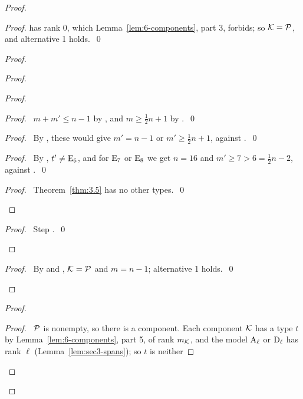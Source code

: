 \begin{proof}
\begin{proof}
  has rank 0, which Lemma~\ref{lem:6-components}, part 3, forbids; so ${\mathcal K}={\mathcal P}$, and
  alternative 1 holds.~\qed\end{proof}
 \begin{proof}
  \begin{proof}
   \begin{proof}
    \begin{proof}\pf\ $m+m'\leq n-1$ by , and $m\geq\frac12n+1$ by
     .~\qed\end{proof}
    \begin{proof}\pf\ By , these would give $m'=n-1$ or
     $m'\geq\frac12n+1$, against .~\qed\end{proof}
    \begin{proof}\pf\ By , $t'\neq\mathrm{E}_6$, and for $\mathrm{E}_7$ or $\mathrm{E}_8$
     we get $n=16$ and $m'\geq7>6=\frac12n-2$, against .~\qed\end{proof}
    \qedstep
    \begin{proof}\pf\ Theorem~\ref{thm:3.5} has no other types.~\qed\end{proof}
   \end{proof}
   \qedstep
   \begin{proof}\pf\ Step .~\qed\end{proof}
  \end{proof}
  \qedstep
  \begin{proof}\pf\ By  and , ${\mathcal K}={\mathcal P}$ and $m=n-1$;
   alternative 1 holds.~\qed\end{proof}
 \end{proof}
 \begin{proof}
  \begin{proof}\pf\ ${\mathcal P}$ is nonempty, so there is a component. Each component ${\mathcal K}$ has a type
   $t$ by Lemma~\ref{lem:6-components}, part 5, of rank $m_{\mathcal K}$, and the model $\mathrm{A}_\ell$
   or $\mathrm{D}_\ell$ has rank $\ell$ (Lemma~\ref{lem:sec3-spans}); so $t$ is neither

\end{proof}
\end{proof}
\end{proof}
